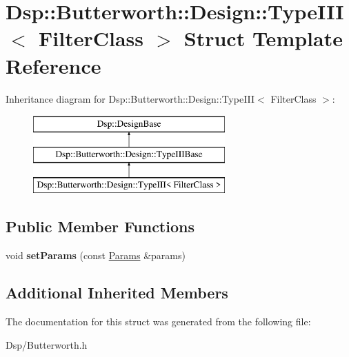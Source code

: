 \hypertarget{structDsp_1_1Butterworth_1_1Design_1_1TypeIII}{\section{Dsp\-:\-:Butterworth\-:\-:Design\-:\-:Type\-I\-I\-I$<$ Filter\-Class $>$ Struct Template Reference}
\label{structDsp_1_1Butterworth_1_1Design_1_1TypeIII}
}
Inheritance diagram for Dsp\-:\-:Butterworth\-:\-:Design\-:\-:Type\-I\-I\-I$<$ Filter\-Class $>$\-:\begin{figure}[H]
\begin{center}
\leavevmode
\includegraphics[height=3.000000cm]{structDsp_1_1Butterworth_1_1Design_1_1TypeIII}
\end{center}
\end{figure}
\subsection*{Public Member Functions}
\begin{DoxyCompactItemize}
\item 
\hypertarget{structDsp_1_1Butterworth_1_1Design_1_1TypeIII_ad1836336392585054aa3f4fce13ba6ed}{void {\bfseries set\-Params} (const \hyperlink{structDsp_1_1Params}{Params} \&params)}\label{structDsp_1_1Butterworth_1_1Design_1_1TypeIII_ad1836336392585054aa3f4fce13ba6ed}

\end{DoxyCompactItemize}
\subsection*{Additional Inherited Members}


The documentation for this struct was generated from the following file\-:\begin{DoxyCompactItemize}
\item 
Dsp/Butterworth.\-h\end{DoxyCompactItemize}
